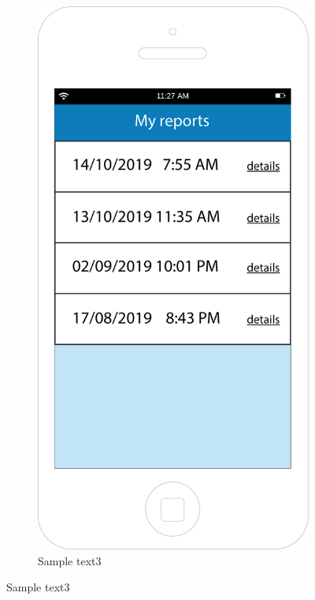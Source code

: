 \documentclass[12pt,a4paper]{report}
\begin{document}
		\begin{figure}
		\begin{subfigure}{0.5\textwidth}
		\setcounter{subfigure}{2}
			\includegraphics[scale=0.25, center]{Myreports}
			\caption{Sample text3}
			\label{fig:subim2}

\end{subfigure}
\end{figure}
\end{document}
